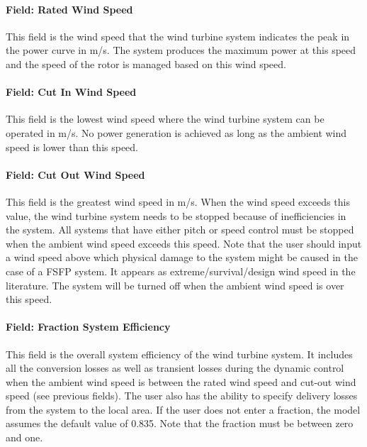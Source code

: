 \paragraph{Field: Rated Wind Speed}\label{field-rated-wind-speed}

This field is the wind speed that the wind turbine system indicates the peak in the power curve in m/s. The system produces the maximum power at this speed and the speed of the rotor is managed based on this wind speed.

\paragraph{Field: Cut In Wind Speed}\label{field-cut-in-wind-speed}

This field is the lowest wind speed where the wind turbine system can be operated in m/s. No power generation is achieved as long as the ambient wind speed is lower than this speed.

\paragraph{Field: Cut Out Wind Speed}\label{field-cut-out-wind-speed}

This field is the greatest wind speed in m/s. When the wind speed exceeds this value, the wind turbine system needs to be stopped because of inefficiencies in the system. All systems that have either pitch or speed control must be stopped when the ambient wind speed exceeds this speed. Note that the user should input a wind speed above which physical damage to the system might be caused in the case of a FSFP system. It appears as extreme/survival/design wind speed in the literature. The system will be turned off when the ambient wind speed is over this speed.

\paragraph{Field: Fraction System Efficiency}\label{field-fraction-system-efficiency}

This field is the overall system efficiency of the wind turbine system. It includes all the conversion losses as well as transient losses during the dynamic control when the ambient wind speed is between the rated wind speed and cut-out wind speed (see previous fields). The user also has the ability to specify delivery losses from the system to the local area. If the user does not enter a fraction, the model assumes the default value of 0.835. Note that the fraction must be between zero and one.

